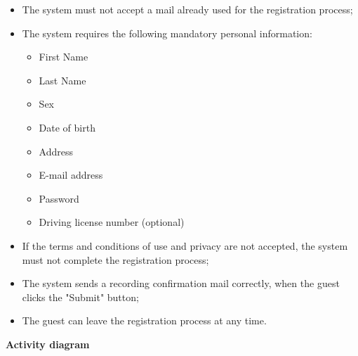 \documentclass{article}
\begin{document}
	\begin{itemize}
		\item The system must not accept a mail already used for the registration process;
		\item The system requires the following mandatory personal information:
			\begin{itemize}
				\item First Name
				\item Last Name
				\item Sex
				\item Date of birth
				\item Address
				\item E-mail address
				\item Password
				\item Driving license number (optional)
			\end{itemize}
		\item If the terms and conditions of use and privacy are not accepted, the system must not complete the registration process;
		\item The system sends a recording confirmation mail correctly, when the guest clicks the "Submit" button;
		\item The guest can leave the registration process at any time.
	\end{itemize}
	
	\newpage
	\noindent
	\textbf{Activity diagram} \\
	
\end{document}
